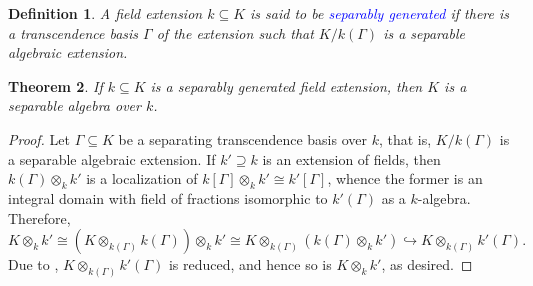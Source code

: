 \documentclass[10pt]{article}
\theoremstyle{thmstyle}
\newtheorem{theorem}{Theorem}[section]
\theoremstyle{defstyle}
\newtheorem{definition}[theorem]{Definition}
\newcommand{\into}{\hookrightarrow}
\newcommand{\define}[1]{\textcolor{blue}{\textit{#1}}}
\begin{document}
\begin{definition}
    A field extension $k\subseteq K$ is said to be \define{separably generated} if there is a transcendence basis $\Gamma$ of the extension such that $K/k(\Gamma)$ is a separable algebraic extension.
\end{definition}

\begin{theorem}
    If $k\subseteq K$ is a separably generated field extension, then $K$ is a separable algebra over $k$.
\end{theorem}
\begin{proof}
    Let $\Gamma\subseteq K$ be a separating transcendence basis over $k$, that is, $K/k(\Gamma)$ is a separable algebraic extension. If $k'\supseteq k$ is an extension of fields, then $k(\Gamma)\otimes_k k'$ is a localization of $k[\Gamma]\otimes_k k'\cong k'[\Gamma]$, whence the former is an integral domain with field of fractions isomorphic to $k'(\Gamma)$ as a $k$-algebra. Therefore, 
    \begin{equation*}
        K\otimes_k k'\cong \left(K\otimes_{k(\Gamma)} k(\Gamma)\right)\otimes_k k'\cong K\otimes_{k(\Gamma)}\left(k(\Gamma)\otimes_k k'\right)\into K\otimes_{k(\Gamma)} k'(\Gamma).
    \end{equation*}
    Due to , $K\otimes_{k(\Gamma)} k'(\Gamma)$ is reduced, and hence so is $K\otimes_k k'$, as desired.
\end{proof}
\end{document}
